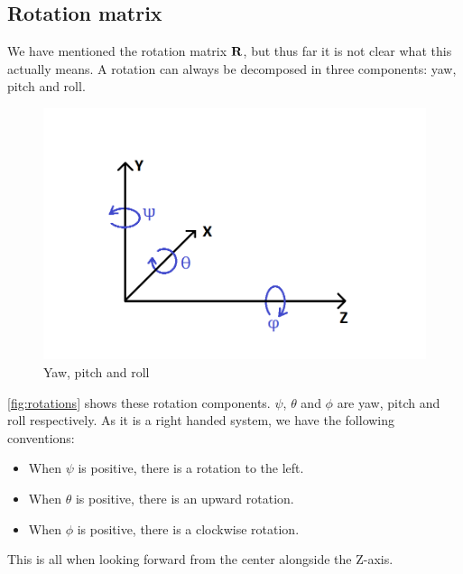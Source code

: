 \subsection{Rotation matrix}\label{ssec:rotmat}
We have mentioned the rotation matrix $\mathbf{R}$, but thus far it is not clear what this actually means. A rotation can always be decomposed in three components: yaw, pitch and roll. \bigskip
\begin{figure}
    \centering
    \includegraphics[width=1\textwidth]{figures/yaw_pitch_roll.png}
    \caption{Yaw, pitch and roll}
    \label{fig:rotations}
\end{figure}

\autoref{fig:rotations} shows these rotation components. $\psi$, $\theta$ and $\phi$ are yaw, pitch and roll respectively. As it is a right handed system, we have the following conventions:
\begin{itemize}
    \item When $\psi$ is positive, there is a rotation to the left.
    \item When $\theta$ is positive, there is an upward rotation.
    \item When $\phi$ is positive, there is a clockwise rotation.
\end{itemize}
This is all when looking forward from the center alongside the Z-axis.\bigskip


